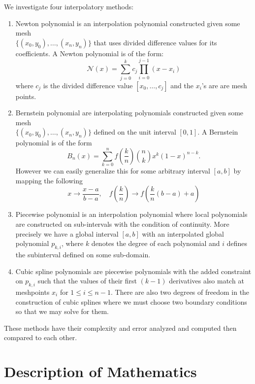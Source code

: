 \documentclass[12pt]{article}
\theoremstyle{remark}
\begin{document}
We investigate four interpolatory methods:
\begin{enumerate}
	\item Newton polynomial is an interpolation polynomial constructed given some mesh \\ $\{(x_0,y_0), \ldots, (x_n, y_n)\}$ that uses divided difference values for its coefficients. A Newton polynomial is of the form:
	\begin{equation}
	 \mathcal{N}(x) = \sum\limits_{j=0}^kc_j\prod\limits_{i=0}^{j-1}(x- x_i) 
	 \end{equation}
	where $c_j$ is the divided difference value $[x_0, \ldots, c_j]$ and the $x_i$'s are are mesh points.
	
	\item Bernstein polynomial are interpolating polynomials constructed given some mesh \\ $\{(x_0,y_0), \ldots, (x_n, y_n)\}$ defined on the unit interval $[0,1]$. A Bernstein polynomial is of the form
	\begin{equation}
	B_n(x) = \sum\limits_{k=0}^{n} f(\frac{k}{n}) {{n}\choose{k}} x^k(1-x)^{n-k}. 
	\end{equation}
	However we can easily generalize this for some arbitrary interval $[a,b]$ by mapping the following
	$$ x \rightarrow \frac{x - a}{b - a}, \quad f(\frac{k}{n}) \rightarrow f(\frac{k}{n}(b-a) + a) $$
	\item Piecewise polynomial is an interpolation polynomial where local polynomials are constructed on sub-intervals with the condition of continuity. More precisely we have a global interval $[a,b]$ with an interpolated global polynomial $p_{k,i}$, where $k$ denotes the degree of each polynomial and $i$ defines the subinterval defined on some sub-domain.  
	\item Cubic spline polynomials are piecewise polynomials with the added constraint on $p_{k,i}$ such that the values of their first $(k-1)$ derivatives also match at meshpoints $x_i$ for $1 \leq i \leq n-1$. There are also two degrees of freedom in the construction of cubic splines where we must choose two boundary conditions so that we may solve for them.
\end{enumerate}

These methods have their complexity and error analyzed and computed then compared to each other. 

\section{Description of Mathematics}
\end{document}
